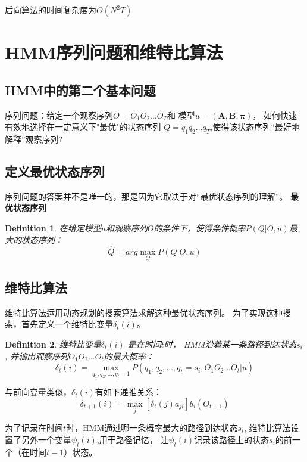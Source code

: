 \documentclass[a4paper,12pt]{book}
\newtheorem{definition}{Definition}
\begin{document}
    后向算法的时间复杂度为$O(N^2T)$

    \section{HMM序列问题和维特比算法}
    \subsection{HMM中的第二个基本问题}
    序列问题：给定一个观察序列$O=O_1O_2\dots O_T$和
    模型$u=(\boldsymbol{A,B,\pi})$，
    如何快速有效地选择在一定意义下"最优"的状态序列
    $Q=q_1q_2\dots q_T$,使得该状态序列“最好地解释”观察序列?

    \subsection{定义最优状态序列}
    序列问题的答案并不是唯一的，那是因为它取决于对“最优状态序列的理解”。
    \textbf{最优状态序列}
    \begin{definition}
        在给定模型$u$和观察序列$O$的条件下，使得条件概率$P(Q|O,u)$最大的状态序列：
        \begin{equation}
            \hat{Q}=arg \max_Q P(Q|O,u)
        \end{equation}
    \end{definition}

    \subsection{维特比算法}
    维特比算法运用动态规划的搜索算法求解这种最优状态序列。
    为了实现这种搜索，首先定义一个维特比变量$\delta_t(i)$。
    \begin{definition}
        维特比变量$\delta_t(i)$ 是在时间$t$时，
        HMM沿着某一条路径到达状态$s_i$,
        并输出观察序列$O_1O_2\dots O_t$的最大概率：
        \begin{equation}
            \delta_t(i) = \max_{q_1,q_2, \dots, q_t-1} P(q_1,q_2, \dots, q_t=s_i, O_1O_2\dots O_t|u)
        \end{equation}
    \end{definition}
    与前向变量类似，$\delta_t(i)$有如下递推关系：
    \begin{equation}
        \delta_{t+1}(i) =  \max_j[\delta_t(j)a_{ji}]b_i(O_{t+1})
    \end{equation}


    为了记录在时间$t$时，HMM通过哪一条概率最大的路径到达状态$s_i$,
    维特比算法设置了另外一个变量$\psi_t(i)$,用于路径记忆，
    让$\psi_t(i)$记录该路径上的状态$s_i$的前一个（在时间$t-1$）状态。
\end{document}
